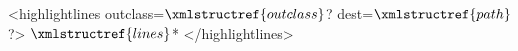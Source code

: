 <highlightlines outclass=$\xmlstructref{outclass}$? dest=$\xmlstructref{path}$?>
  $\xmlstructref{lines}$*
</highlightlines>
